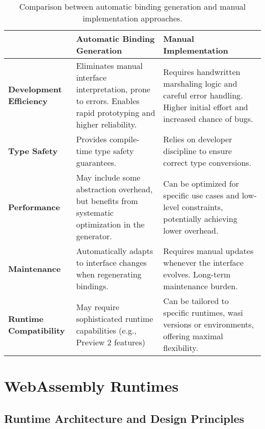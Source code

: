 \begin{table}[H]
    \centering
    \begin{tabular}{|C{2.1cm}|C{6cm}|C{6cm}|}
    \hline
            & \textbf{Automatic Binding Generation} & \textbf{Manual Implementation} \\
    \hline
    \textbf{Development Efficiency} & Eliminates manual interface interpretation, prone to errors. Enables rapid prototyping and higher reliability. & Requires handwritten marshaling logic and careful error handling. Higher initial effort and increased chance of bugs. \\
    \hline
    \textbf{Type Safety} & Provides compile-time type safety guarantees. & Relies on developer discipline to ensure correct type conversions. \\
    \hline
    \textbf{Performance} & May include some abstraction overhead, but benefits from systematic optimization in the generator. & Can be optimized for specific use cases and low-level constraints, potentially achieving lower overhead. \\
    \hline
    \textbf{Maintenance} & Automatically adapts to interface changes when regenerating bindings. & Requires manual updates whenever the interface evolves. Long-term maintenance burden. \\
    \hline
    \textbf{Runtime Compatibility} & May require sophisticated runtime capabilities (e.g., Preview 2 features) & Can be tailored to specific runtimes, \acrshort{wasi} versions or environments, offering maximal flexibility. \\
    \hline
    \end{tabular}
    \caption{Comparison between automatic binding generation and manual implementation approaches.}
    \label{tab:binding-vs-manual}
\end{table}












\section{WebAssembly Runtimes}
\label{sec:wasm-runtimes}

\subsection{Runtime Architecture and Design Principles}
\label{subsec:runtime-architecture}

